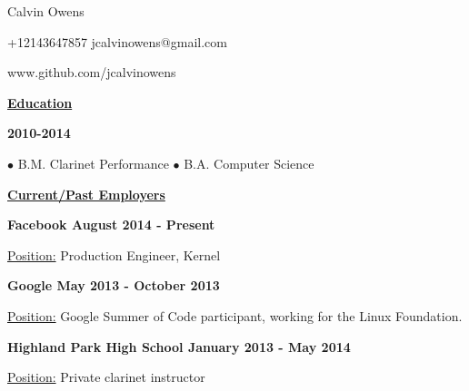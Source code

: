 \documentclass[11pt]{article}
\begin{document}
\centerline{{\Huge \sc Calvin Owens}}
\centerline{+12143647857 \textbullet \hspace{1pt} jcalvinowens@gmail.com}
\centerline{www.github.com/jcalvinowens}

\noindent
\hrulefill

\centerline{\underline{\bf Education}}
\bigskip
{} \hfill {\bf 2010-2014} \\
\centerline{\hfill $\bullet$ B.M. Clarinet Performance \hfill $\bullet$ B.A. Computer Science \hfill}

\noindent
\hrulefill

\centerline{\underline{\bf Current/Past Employers}}
\bigskip
\noindent\centerline{\bf Facebook \hfill August 2014 - Present}
\underline{Position:} Production Engineer, Kernel
\vspace*{6pt}\\
\noindent\centerline{\bf Google \hfill May 2013 - October 2013}
\underline{Position:} Google Summer of Code participant, working for the Linux Foundation.
\vspace*{6pt}\\
\noindent\centerline{\bf Highland Park High School \hfill January 2013 - May 2014}
\underline{Position:} Private clarinet instructor

\noindent
\hrulefill
\end{document}
